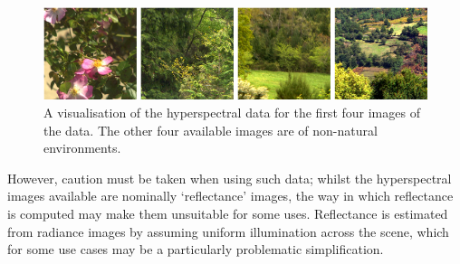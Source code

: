 \begin{figure}[htbp]
    \includegraphics[max width=\textwidth]{figs/LitRev/Foster.png}
    \caption{A visualisation of the hyperspectral data for the first four images of the \citet{nascimento_statistics_2002} data. The other four available images are of non-natural environments.}
    \label{fig:Foster}
\end{figure} 


However, caution must be taken when using such data; whilst the hyperspectral images available are nominally `reflectance' images, the way in which reflectance is computed may make them unsuitable for some uses. Reflectance is estimated from radiance images by assuming uniform illumination across the scene, which for some use cases may be a particularly problematic simplification. %

